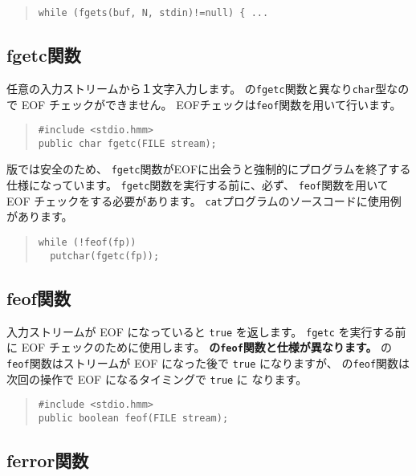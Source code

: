 \begin{quote}
\begin{verbatim}
while (fgets(buf, N, stdin)!=null) { ...
\end{verbatim}
\end{quote}


\subsection{fgetc関数}

任意の入力ストリームから１文字入力します。
\cl の\verb/fgetc/関数と異なり\verb/char/型なので EOF チェックができません。
EOFチェックは\verb/feof/関数を用いて行います。

\begin{quote}
\begin{verbatim}
#include <stdio.hmm>
public char fgetc(FILE stream);
\end{verbatim}
\end{quote}

\tac 版では安全のため、
\verb/fgetc/関数がEOFに出会うと強制的にプログラムを終了する仕様になっています。
\verb/fgetc/関数を実行する前に、必ず、
\verb/feof/関数を用いて EOF チェックをする必要があります。
\verb/cat/プログラムのソースコードに使用例があります。

\begin{quote}
\begin{verbatim}
while (!feof(fp))
  putchar(fgetc(fp));
\end{verbatim}
\end{quote}

\subsection{feof関数}

入力ストリームが EOF になっていると \verb/true/ を返します。
\verb/fgetc/ を実行する前に EOF チェックのために使用します。
{\bf \cl の\verb/feof/関数と仕様が異なります。}
\cl の\verb/feof/関数はストリームが EOF になった後で \verb/true/ になりますが、
\cmml の\verb/feof/関数は次回の操作で EOF になるタイミングで \verb/true/ に
なります。

\begin{quote}
\begin{verbatim}
#include <stdio.hmm>
public boolean feof(FILE stream);
\end{verbatim}
\end{quote}

\subsection{ferror関数}

